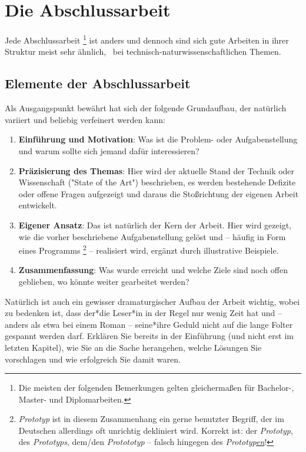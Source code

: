 \chapter{Die Abschlussarbeit}
\label{cha:TheThesis}

Jede Abschlussarbeit%
\footnote{Die meisten der folgenden Bemerkungen gelten gleichermaßen für
Bachelor-, Master- und Diplomarbeiten.}
ist anders und dennoch sind sich gute Arbeiten in ihrer Struktur meist sehr
ähnlich, \va\ bei technisch-natur\-wissen\-schaft\-lichen Themen.

\section{Elemente der Abschlussarbeit}

Als Ausgangspunkt bewährt hat sich der folgende Grundaufbau, der natürlich 
vari\-iert und beliebig verfeinert werden kann:
%
\begin{enumerate}
    \item \textbf{Einführung und Motivation}: Was ist die Problem- oder
    Aufgabenstellung und
    warum sollte sich jemand dafür interessieren?
    \item \textbf{Präzisierung des Themas}: Hier wird der aktuelle Stand der
    Technik oder Wissenschaft ("State of the Art") beschrieben, es werden
    bestehende Defizite oder offene Fragen aufgezeigt und daraus die
    Stoßrichtung der eigenen Arbeit entwickelt.
    \item \textbf{Eigener Ansatz}: Das ist natürlich der Kern der Arbeit. Hier
    wird gezeigt, wie die vorher beschriebene Aufgabenstellung gelöst und --
    häufig in Form eines Programms%
    \footnote{\emph{Prototyp} ist in diesem Zusammenhang ein gerne benutzter
    Begriff, der im Deutschen allerdings oft unrichtig dekliniert wird.
    Korrekt ist: der \emph{Prototyp}, des \emph{Prototyps}, dem/den
    \emph{Protototyp} -- falsch hingegen des \emph{Prototyp\underline{en}}!}
    -- realisiert wird, ergänzt durch illustrative Beispiele.
    \item \textbf{Zusammenfassung}: Was wurde erreicht und welche Ziele sind
    noch offen geblieben, wo könnte weiter gearbeitet werden?
\end{enumerate}
%
Natürlich ist auch ein gewisser dramaturgischer Aufbau der Arbeit wichtig,
wobei zu bedenken ist, dass der*die Leser*in in der Regel nur wenig Zeit hat
und -- anders als etwa bei einem Roman -- seine*ihre Geduld nicht auf die
lange Folter gespannt werden darf. Erklären Sie bereits in der Einführung
(und nicht erst im letzten Kapitel), wie Sie an die Sache herangehen, welche
Lösungen Sie vorschlagen und wie erfolgreich Sie damit waren.

